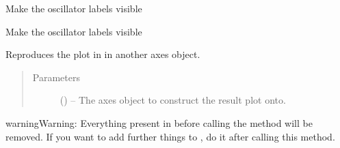 \documentclass[letterpaper,10pt,english]{sphinxmanual}
\begin{document}
\begin{fulllineitems}

\begin{fulllineitems}
\label{\detokenize{references/plot:nmrespy.plot.NmrespyPlot.hide_labels}}
\sphinxAtStartPar
Make the oscillator labels visible

\end{fulllineitems}


\begin{fulllineitems}
\label{\detokenize{references/plot:nmrespy.plot.NmrespyPlot.show_labels}}
\sphinxAtStartPar
Make the oscillator labels visible

\end{fulllineitems}


\begin{fulllineitems}
\label{\detokenize{references/plot:nmrespy.plot.NmrespyPlot.transfer_to_axes}}
\sphinxAtStartPar
Reproduces the plot in  in another axes object.
\begin{quote}\begin{description}
\item[{Parameters}] \leavevmode
\sphinxAtStartPar
{} () – The axes object to construct the result plot onto.

\end{description}\end{quote}

\begin{sphinxadmonition}{warning}{Warning:}
\sphinxAtStartPar
Everything present in  before calling the method will be
removed. If you want to add further things to , do it after calling
this method.
\end{sphinxadmonition}

\end{fulllineitems}


\end{fulllineitems}
\end{document}
